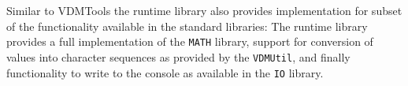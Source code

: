 Similar to VDMTools the runtime library also provides implementation
for subset of the functionality available in the standard libraries:
The runtime library provides a full implementation of the
\texttt{MATH} library, support for conversion of values into character
sequences as provided by the \texttt{VDMUtil}, and finally
functionality to write to the console as available in the \texttt{IO}
library.
